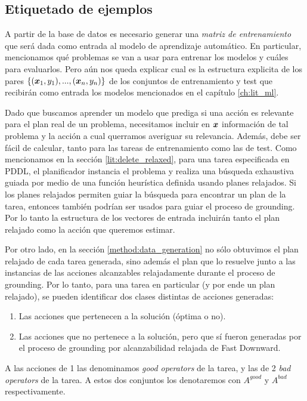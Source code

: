 \subsection{Etiquetado de ejemplos}
\label{method:labeling}

A partir de la base de datos es necesario generar una \emph{matriz de
entrenamiento} que será dada como entrada al modelo de aprendizaje automático.
En particular, mencionamos qué problemas se van a usar para entrenar los modelos
y cuáles para evaluarlos. Pero aún nos queda explicar cual es la estructura
explicita de los pares $\{(\boldsymbol{x}_1, y_1), ..., (\boldsymbol{x}_n, y_n)\}$ de los
conjuntos de entrenamiento y test que recibirán como entrada los modelos
mencionados en el capítulo \ref{ch:lit_ml}.

Dado que buscamos aprender un modelo que prediga si una acción es relevante para
el plan real de un problema, necesitamos incluir en $\boldsymbol{x}$ información de
tal problema y la acción a cual querramos averiguar su relevancia. Además, debe
ser fácil de calcular, tanto para las tareas de entrenamiento como las de test.
Como mencionamos en la sección \ref{lit:delete_relaxed}, para una tarea
especificada en PDDL, el planificador instancia el problema y realiza una
búsqueda exhaustiva guiada por medio de una función heurística definida usando
planes relajados. Si los planes relajados permiten guiar la búsqueda para
encontrar un plan de la tarea, entonces también podrían ser usados para guiar el
proceso de grounding. Por lo tanto la estructura de los vectores de entrada
incluirán tanto el plan relajado como la acción que queremos estimar.

Por otro lado, en la sección \ref{method:data_generation} no sólo obtuvimos el
plan relajado de cada tarea generada, sino además el plan que lo resuelve junto
a las instancias de las acciones alcanzables relajadamente durante el proceso de
grounding. Por lo tanto, para una tarea en particular (y por ende un plan
relajado), se pueden identificar dos clases distintas de acciones generadas:

\begin{enumerate}
    \item Las acciones que pertenecen a la solución (óptima o no).
    \item Las acciones que no pertenece a la solución, pero que sí fueron
    generadas por el proceso de grounding por alcanzabilidad relajada de Fast
    Downward.
\end{enumerate}

A las acciones de 1 las denominamos \emph{good operators} de la tarea, y las de
2 \emph{bad operators} de la tarea. A estos dos conjuntos los denotaremos con
$A^{good}$ y $A^{bad}$ respectivamente.

